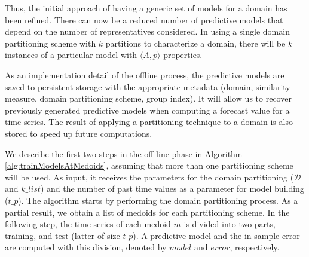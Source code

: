 Thus, the initial approach of having a generic set of models for a domain has been refined. There can now be a reduced number of predictive models that depend on the number of representatives considered. In using a single domain partitioning scheme with $k$ partitions to characterize a domain, there will be $k$ instances of a particular model with $\langle A, p \rangle$ properties. 

As an implementation detail of the offline process, the predictive models are saved to persistent storage with the appropriate metadata (domain, similarity measure, domain partitioning scheme, group index). It will allow us to recover previously generated predictive models when computing a forecast value for a time series. The result of applying a partitioning technique to a domain is also stored to speed up future computations.

We describe the first two steps in the off-line phase in Algorithm \ref{alg:trainModelsAtMedoids}, assuming that more than one partitioning scheme will be used. As input, it receives the parameters for the domain partitioning ($\mathcal{D}$ and $k\_list$) and the number of past time values as a parameter for model building ($t\_p$). The algorithm starts by performing the domain partitioning process. As a partial result, we obtain a list of medoids for each partitioning scheme. In the following step, the time series of each medoid $m$ is divided into two parts, training, and test (latter of size $t\_p$). A predictive model and the in-sample error are computed with this division, denoted by $model$ and $error$, respectively.

